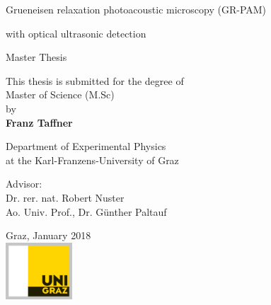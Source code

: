 
\thispagestyle{empty}
\begin{center}

\vspace*{0.5cm}

\begin{huge}
\color{blue}

Grueneisen relaxation photoacoustic microscopy (GR-PAM)


\end{huge}

\vspace*{3mm}

\Large{with optical ultrasonic detection}

\vspace*{1.5cm}

\huge{Master Thesis}

\vspace*{1cm}

\large

This thesis is submitted for the degree of\\
Master of Science (M.Sc) \\
by\\
\vspace*{5mm}
\Large\textbf{Franz Taffner}\\

\vspace*{5mm}

Department of Experimental Physics \\
at the Karl-Franzens-University of Graz

\vspace*{2cm}

Advisor: \\
Dr. rer. nat. Robert Nuster\\
Ao. Univ. Prof., Dr. G\"unther Paltauf

\vspace*{1cm}

Graz, January 2018\\
\vspace*{0.5cm}
\includegraphics[width=2.5cm]{00_coverpage/images/logo_uni_graz_4c.jpg} \\

\end{center}
\newpage
\thispagestyle{empty}
